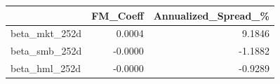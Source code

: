 \begin{tabular}{lrr}
\toprule
 & FM\_Coeff & Annualized\_Spread\_\% \\
\midrule
beta\_mkt\_252d & 0.0004 & 9.1846 \\
beta\_smb\_252d & -0.0000 & -1.1882 \\
beta\_hml\_252d & -0.0000 & -0.9289 \\
\bottomrule
\end{tabular}
